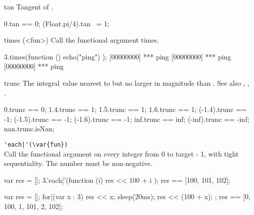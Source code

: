 \begin{urbiscriptapi}
\item[tan]%
  Tangent of \this.
\begin{urbiassert}
0.tan == 0;
(Float.pi/4).tan ~= 1;
\end{urbiassert}


\item[times](<fun>)%
  Call the functional argument  \this times.

\begin{urbiscript}
3.times(function () { echo("ping") });
[00000000] *** ping
[00000000] *** ping
[00000000] *** ping
\end{urbiscript}


\item[trunc]%
  The integral value nearest to but no larger in magnitude than \this.  See
  also , , .
\begin{urbiassert}
     0.trunc ==  0;
   1.4.trunc ==  1;     1.5.trunc ==  1;    1.6.trunc ==  1;
(-1.4).trunc == -1;  (-1.5).trunc == -1; (-1.6).trunc == -1;
   inf.trunc == inf; (-inf).trunc == -inf;
   nan.trunc.isNan;
\end{urbiassert}


\item \lstinline='each|'(\var{fun})=\\%
  Call the functional argument  on every integer from 0 to
  target - 1, with tight sequentiality.  The number must be
  non-negative.
\begin{urbiassert}
{
  var res = [];
  3.'each|'(function (i) { res << 100 + i });
  res
}
== [100, 101, 102];

{
  var res = [];
  for|(var x : 3) { res << x; sleep(20ms); res << (100 + x); };
  res
}
== [0, 100, 1, 101, 2, 102];
\end{urbiassert}%
\end{urbiscriptapi}

